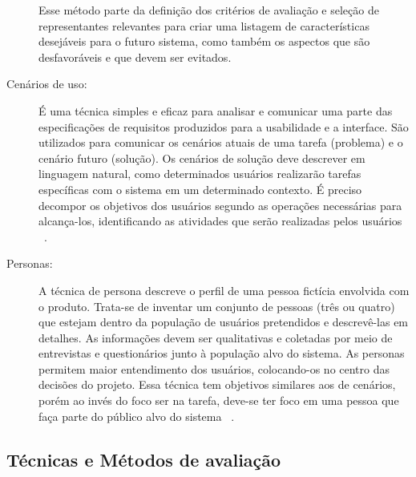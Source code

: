 \begin{description}
	Esse método parte da definição dos critérios de avaliação e seleção de representantes relevantes para criar uma listagem de características desejáveis para o futuro sistema, como também os aspectos que são desfavoráveis e que devem ser evitados.

\item[Cenários de uso:]

	É uma técnica simples e eficaz para analisar e comunicar uma parte das especificações de requisitos produzidos para a usabilidade e a interface. São utilizados para comunicar os cenários atuais de uma tarefa (problema) e o cenário futuro (solução). Os cenários de solução deve descrever em linguagem natural, como determinados usuários realizarão tarefas específicas com o sistema em um determinado contexto. É preciso decompor os objetivos dos usuários segundo as operações necessárias para alcança-los, identificando as atividades que serão realizadas pelos usuários ~\cite{cybis2010}.

\item[Personas:]

	A técnica de persona descreve o perfil de uma pessoa fictícia envolvida com o produto. Trata-se de inventar um conjunto de pessoas (três ou quatro) que estejam dentro da população de usuários pretendidos e descrevê-las em detalhes.
%
	As informações devem ser qualitativas e coletadas por meio de entrevistas e questionários junto à população alvo do sistema. As personas permitem maior entendimento dos usuários, colocando-os no centro das decisões do projeto. Essa técnica tem objetivos similares aos de cenários, porém ao invés do foco ser na tarefa, deve-se ter foco em uma pessoa que faça parte do público alvo do sistema ~\cite{cybis2010}.

\end{description}

\subsection{Técnicas e Métodos de avaliação}

